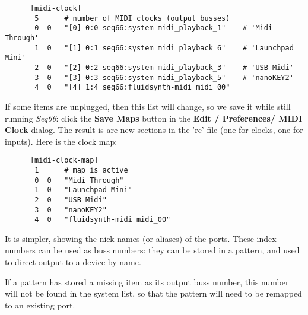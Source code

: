    \begin{verbatim}
      [midi-clock]
       5      # number of MIDI clocks (output busses)
       0  0   "[0] 0:0 seq66:system midi_playback_1"    # 'Midi Through'
       1  0   "[1] 0:1 seq66:system midi_playback_6"    # 'Launchpad Mini'
       2  0   "[2] 0:2 seq66:system midi_playback_3"    # 'USB Midi'
       3  0   "[3] 0:3 seq66:system midi_playback_5"    # 'nanoKEY2'
       4  0   "[4] 1:4 seq66:fluidsynth-midi midi_00"
   \end{verbatim}

   If some items are unplugged, then this list will change, so we save it while
   still running \textsl{Seq66}:
   click the
   \textbf{Save Maps} button in the
   \textbf{Edit / Preferences/ MIDI Clock} dialog. 
   The result is are new sections in the 'rc' file (one for clocks, one for
   inputs).  Here is the clock map:

   \begin{verbatim}
      [midi-clock-map]
       1      # map is active
       0  0   "Midi Through"
       1  0   "Launchpad Mini"
       2  0   "USB Midi"
       3  0   "nanoKEY2"
       4  0   "fluidsynth-midi midi_00"
   \end{verbatim}
   
   It is simpler, showing the nick-names (or aliases) of the ports.
   These index numbers can be used as buss numbers: they can be stored
   in a pattern, and used to direct output to a
   device by name.




   If a pattern has stored a missing item as its output
   buss number, this number will not be found in the system list, so that the
   pattern will need to be remapped to an existing port.

